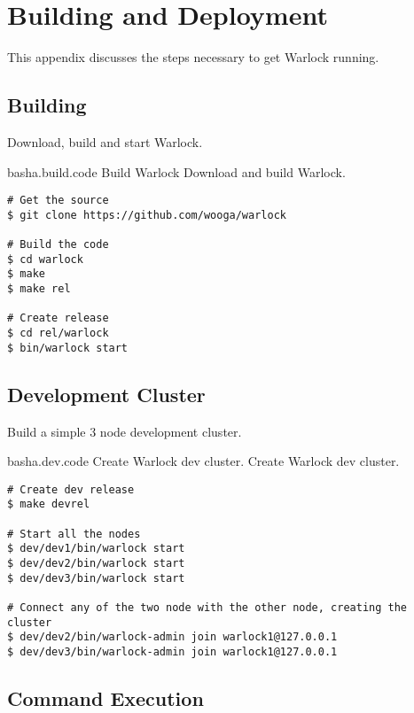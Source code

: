 \chapter{Building and Deployment}
\label{appendix:building.deployment}

This appendix discusses the steps necessary to get Warlock running.%

\section{Building}

Download, build and start Warlock.

\begin{scode}{bash}{a.build.code}{%
  Build Warlock}{%
  Download and build Warlock.}
  \begin{lstlisting}
# Get the source  
$ git clone https://github.com/wooga/warlock

# Build the code
$ cd warlock
$ make
$ make rel

# Create release
$ cd rel/warlock
$ bin/warlock start
  \end{lstlisting}
\end{scode}

\section{Development Cluster}

Build a simple 3 node development cluster.

\begin{scode}{bash}{a.dev.code}{%
  Create Warlock dev cluster.}{%
  Create Warlock dev cluster.}
  \begin{lstlisting}
# Create dev release
$ make devrel

# Start all the nodes
$ dev/dev1/bin/warlock start
$ dev/dev2/bin/warlock start
$ dev/dev3/bin/warlock start

# Connect any of the two node with the other node, creating the cluster
$ dev/dev2/bin/warlock-admin join warlock1@127.0.0.1
$ dev/dev3/bin/warlock-admin join warlock1@127.0.0.1
  \end{lstlisting}
\end{scode}

\section{Command Execution}

